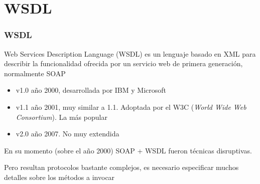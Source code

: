 \documentclass[ucs]{beamer}
\begin{document}
\section{WSDL}
\begin{frame}[fragile]
\frametitle{WSDL}
Web Services Description Language (WSDL) es un lenguaje basado en XML para describir la 
funcionalidad
ofrecida por un servicio web de primera generación, normalmente SOAP

\begin{itemize}
\item
v1.0 año 2000, desarrollada por IBM y Microsoft
\item
v1.1 año 2001, muy similar a 1.1. 
Adoptada por el W3C (\emph{World Wide Web Consortium}).
La más popular
\item
v2.0 año 2007. No muy extendida
\end{itemize}

En su momento (sobre el año 2000) SOAP + WSDL fueron técnicas disruptivas.

Pero resultan protocolos bastante complejos,
es necesario especificar muchos detalles
sobre los métodos a invocar

\end{frame}
\end{document}
